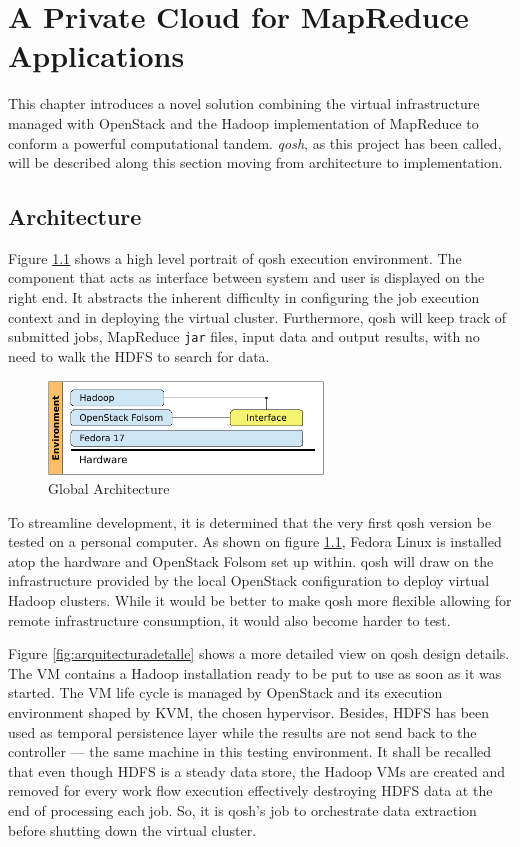 \chapter{A Private Cloud for MapReduce Applications}\label{cap:solucion}
\noindent This chapter introduces a novel solution combining the virtual infrastructure managed with OpenStack and the Hadoop implementation of MapReduce to conform a powerful computational tandem. \emph{qosh}, as this project has been called, will be described along this section moving from architecture to implementation.

\section{Architecture}\label{sec:diseno}
\noindent Figure \ref{fig:arquitecturaglobal} shows a high level portrait of qosh execution environment. The component that acts as interface between system and user is displayed on the right end. It abstracts the inherent difficulty in configuring the job execution context and in deploying the virtual cluster. Furthermore, qosh will keep track of submitted jobs, MapReduce \texttt{jar} files, input data and output results, with no need to walk the HDFS to search for data.

\begin{figure}[tbp]
\begin{center}
\includegraphics[width=0.65\textwidth]{imagenes/021.pdf}
 \caption{Global Architecture}
\label{fig:arquitecturaglobal}
\end{center}
\end{figure}

To streamline development, it is determined that the very first qosh version be tested on a personal computer. As shown on figure \ref{fig:arquitecturaglobal}, Fedora Linux is installed atop the hardware and OpenStack Folsom set up within. qosh will draw on the infrastructure provided by the local OpenStack configuration to deploy virtual Hadoop clusters. While it would be better to make qosh more flexible allowing for remote infrastructure consumption, it would also become harder to test.

Figure \ref{fig:arquitecturadetalle} shows a more detailed view on qosh design details. The VM contains a Hadoop installation ready to be put to use as soon as it was started. The VM life cycle is managed by OpenStack and its execution environment shaped by KVM, the chosen hypervisor. Besides, HDFS has been used as temporal persistence layer while the results are not send back to the controller --- the same machine in this testing environment. It shall be recalled that even though HDFS is a steady data store, the Hadoop VMs are created and removed for every work flow execution effectively destroying HDFS data at the end of processing each job. So, it is qosh's job to orchestrate data extraction before shutting down the virtual cluster.

